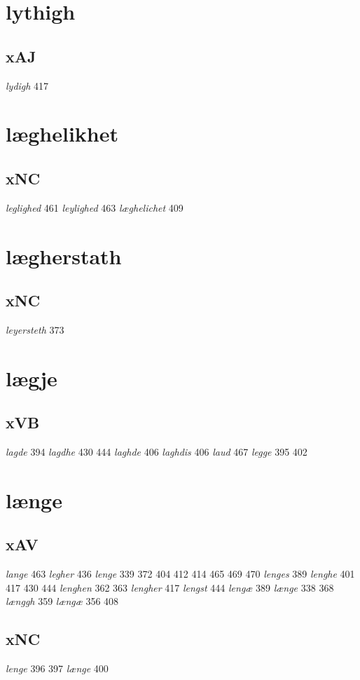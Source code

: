 \documentclass[a4paper,twocolumn]{article}
\begin{document}
\section{lythigh}
\label{sec:orga626478}
\subsection{xAJ}
\label{sec:orgfd770dc}
\emph{lydigh} 417 
\section{læghelikhet}
\label{sec:orgababdd3}
\subsection{xNC}
\label{sec:orgb9897ab}
\emph{leglighed} 461 \emph{leylighed} 463 \emph{læghelichet} 409 
\section{lægherstath}
\label{sec:org58e1d64}
\subsection{xNC}
\label{sec:orge4cf5b8}
\emph{leyersteth} 373 
\section{lægje}
\label{sec:org93a2863}
\subsection{xVB}
\label{sec:org89db216}
\emph{lagde} 394 \emph{lagdhe} 430 444 \emph{laghde} 406 \emph{laghdis} 406 \emph{laud} 467 \emph{legge} 395 402 
\section{længe}
\label{sec:orgb03a144}
\subsection{xAV}
\label{sec:orga7a27ed}
\emph{lange} 463 \emph{legher} 436 \emph{lenge} 339 372 404 412 414 465 469 470 \emph{lenges} 389 \emph{lenghe} 401 417 430 444 \emph{lenghen} 362 363 \emph{lengher} 417 \emph{lengst} 444 \emph{lengæ} 389 \emph{længe} 338 368 \emph{længgh} 359 \emph{længæ} 356 408 
\subsection{xNC}
\label{sec:orgc4ea490}
\emph{lenge} 396 397 \emph{længe} 400 
\end{document}
